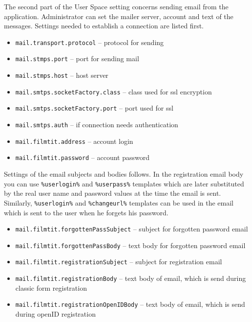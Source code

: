 The second part of the User Space setting concerns sending email from the application. Administrator can set the mailer server, account and text of the messages. Settings needed to establish a connection are listed first.

\begin{itemize}
   \item \verb#mail.transport.protocol# -- protocol for sending
   \item \verb#mail.stmps.port# -- port for sending mail
   \item \verb#mail.stmps.host# -- host server
	\item \verb#mail.smtps.socketFactory.class# -- class used for ssl encryption
	\item \verb#mail.smtps.socketFactory.port# -- port used for ssl
	\item \verb#mail.smtps.auth# -- if connection needs authentication
	\item \verb#mail.filmtit.address# -- account login
	\item \verb#mail.filmtit.password# -- account password
\end{itemize}

Settings of the email subjects and bodies follows. In the registration email body you can use {\tt \%userlogin\%} and {\tt \%userpass\%} templates which are later substituted by the real user name and password values at the time the email is sent. Similarly, {\tt \%userlogin\%} and {\tt \%changeurl\%} templates can be used in the email which is sent to the user when he forgets his password.

\begin{itemize}
\item \verb#mail.filmtit.forgottenPassSubject# -- subject for forgotten password email
\item \verb#mail.filmtit.forgottenPassBody# -- text body for forgotten password email
\item \verb#mail.filmtit.registrationSubject# -- subject for registration email
\item \verb#mail.filmtit.registrationBody# -- text body of email, which is send during classic form registration 
\item \verb#mail.filmtit.registrationOpenIDBody# -- text body of email, which is send during openID registration 
\end{itemize}

